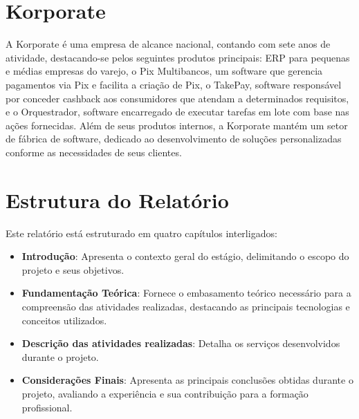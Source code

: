 \section{Korporate}

A Korporate é uma empresa de alcance nacional, contando com sete anos de atividade, 
destacando-se pelos seguintes produtos principais: ERP para pequenas e médias 
empresas do varejo, o Pix Multibancos, um software que gerencia pagamentos via Pix 
e facilita a criação de Pix, o TakePay, software responsável por conceder cashback 
aos consumidores que atendam a determinados requisitos, e o Orquestrador, software 
encarregado de executar tarefas em lote com base nas ações fornecidas. Além de seus 
produtos internos, a Korporate mantém um setor de fábrica de software, dedicado ao 
desenvolvimento de soluções personalizadas conforme as necessidades de seus 
clientes.

\section{Estrutura do Relatório}

Este relatório está estruturado em quatro capítulos interligados:

\begin{itemize}

\item \textbf{Introdução}: Apresenta o contexto geral do estágio, delimitando o 
escopo do projeto e seus objetivos.

\item \textbf{Fundamentação Teórica}:  Fornece o embasamento teórico necessário 
para a compreensão das atividades realizadas, destacando as principais tecnologias 
e conceitos utilizados.

\item \textbf{Descrição das atividades realizadas}: Detalha os serviços 
desenvolvidos durante o projeto.

\item \textbf{Considerações Finais}: Apresenta as principais conclusões obtidas 
durante o projeto, avaliando a experiência e sua contribuição para a formação 
profissional.

\end{itemize}